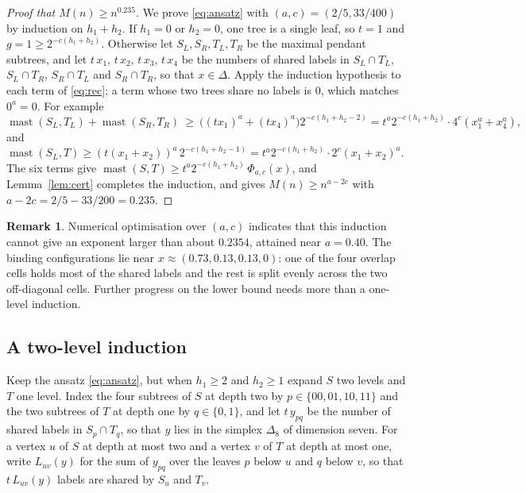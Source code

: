 \documentclass[11pt]{amsart}
\theoremstyle{definition}
\newtheorem{rem}[theorem]{Remark}
\newcommand{\mast}{\operatorname{mast}}
\begin{document}
\begin{proof}[Proof that $M(n)\ge n^{0.235}$]
We prove \eqref{eq:ansatz} with $(a,c)=(2/5,33/400)$ by induction on $h_1+h_2$. If $h_1=0$ or
$h_2=0$, one tree is a single leaf, so $t=1$ and $g=1\ge 2^{-c(h_1+h_2)}$. Otherwise let
$S_L,S_R,T_L,T_R$ be the maximal pendant subtrees, and let $t\,x_1$, $t\,x_2$, $t\,x_3$,
$t\,x_4$ be the numbers of shared labels in $S_L\cap T_L$, $S_L\cap T_R$, $S_R\cap T_L$ and
$S_R\cap T_R$, so that $x\in\Delta$. Apply the induction hypothesis to each term of
\eqref{eq:rec}; a term whose two trees share no labels is $0$, which matches $0^a=0$. For
example
\[
\mast(S_L,T_L)+\mast(S_R,T_R)\ \ge\ \bigl((tx_1)^a+(tx_4)^a\bigr)2^{-c(h_1+h_2-2)}
= t^a2^{-c(h_1+h_2)}\cdot 4^c(x_1^a+x_4^a),
\]
and $\mast(S_L,T)\ge (t(x_1+x_2))^a\,2^{-c(h_1+h_2-1)}=t^a2^{-c(h_1+h_2)}\cdot2^c(x_1+x_2)^a$. The
six terms give $\mast(S,T)\ge t^a2^{-c(h_1+h_2)}\,\Phi_{a,c}(x)$, and Lemma~\ref{lem:cert}
completes the induction, and gives $M(n)\ge n^{a-2c}$ with $a-2c=2/5-33/200=0.235$.
\end{proof}

\begin{rem}
Numerical optimisation over $(a,c)$ indicates that this induction cannot give an exponent
larger than about $0.2354$, attained near $a=0.40$. The binding configurations lie near
$x\approx(0.73,0.13,0.13,0)$: one of the four overlap cells holds most of the shared labels
and the rest is split evenly across the two off-diagonal cells. Further progress on the lower bound needs more than a
one-level induction.
\end{rem}

\subsection*{A two-level induction}
Keep the ansatz \eqref{eq:ansatz}, but when $h_1\ge2$ and $h_2\ge1$ expand $S$ two levels and $T$ one
level. Index the four subtrees of $S$ at depth two by $p\in\{00,01,10,11\}$ and the two subtrees of
$T$ at depth one by $q\in\{0,1\}$, and let $t\,y_{pq}$ be the number of shared labels in $S_p\cap T_q$,
so that $y$ lies in the simplex $\Delta_8$ of dimension seven. For a vertex $u$ of $S$ at depth at most two and
a vertex $v$ of $T$ at depth at most one, write $L_{uv}(y)$ for the sum of $y_{pq}$ over the leaves $p$
below $u$ and $q$ below $v$, so that $t\,L_{uv}(y)$ labels are shared by $S_u$ and $T_v$.
\end{document}

